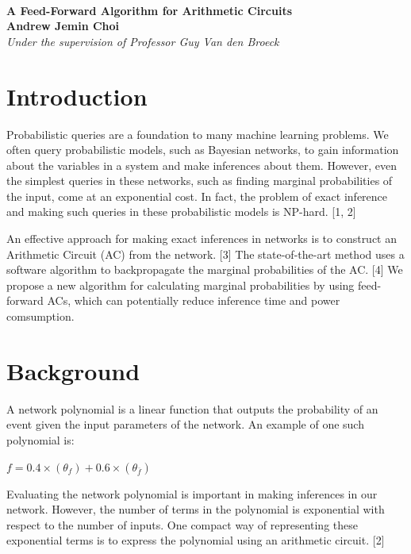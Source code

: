 \documentclass[11pt,a4paper, final, twoside]{article}
\theoremstyle{proposition}
\theoremstyle{definition}
\theoremstyle{remark}
\numberwithin{equation}{section}
\begin{document}

\begin{center}
{\Large \textbf{\\A Feed-Forward Algorithm for Arithmetic Circuits}}\\[5mm]
{\large \textbf{Andrew Jemin Choi}\\[1mm]}
{\normalsize \emph{Under the supervision of Professor Guy Van den Broeck}\\[1mm]}
\end{center}

\section{Introduction}\label{I1}
Probabilistic queries are a foundation to many machine learning problems. We often query probabilistic models, such as Bayesian networks, to gain information about the variables in a system and make inferences about them. However, even the simplest queries in these networks, such as finding marginal probabilities of the input, come at an exponential cost. In fact, the problem of exact inference and making such queries in these probabilistic models is NP-hard. [1, 2]

An effective approach for making exact inferences in networks is to construct an Arithmetic Circuit (AC) from the network. [3] The state-of-the-art method uses a software algorithm to backpropagate the marginal probabilities of the AC. [4] We propose a new algorithm for calculating marginal probabilities by using feed-forward ACs, which can potentially reduce inference time and power comsumption. 

\section{Background}\label{I2}
A network polynomial is a linear function that outputs the probability of an event given the input parameters of the network. An example of one such polynomial is: \newline \centerline{$f=0.4\times(\theta_{f}) + 0.6\times(\theta_{\overline{f}})$} \newline
Evaluating the network polynomial is important in making inferences in our network. However, the number of terms in the polynomial is exponential with respect to the number of inputs. One compact way of representing these exponential terms is to express the polynomial using an arithmetic circuit. [2] 
\end{document}
